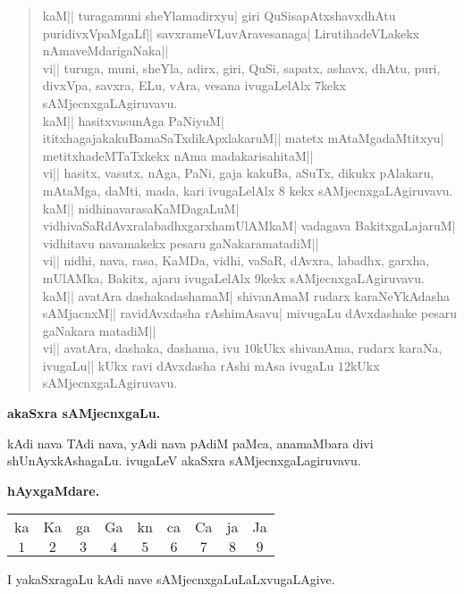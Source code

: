 \begin{verse}
kaM|| turagamuni sheYlamadirxyu| giri QuSisapAtxshavxdhAtu puridivxVpaMgaLf|| savxrameVLuvAravesanaga| LirutihadeVLakekx nAmaveMdarigaNaka||\\

vi|| turuga, muni, sheYla, adirx, giri, QuSi, sapatx, ashavx, dhAtu, puri, divxVpa, savxra, ELu, vAra, vesana ivugaLelAlx $7$kekx sAMjecnxgaLAgiruvavu.\\

kaM|| hasitxvasunAga PaNiyuM| ititxhagajakakuBamaSaTxdikApxlakaruM|| matetx mAtaMgadaMtitxyu| metitxhadeMTaTxkekx nAma madakarisahitaM||\\

vi|| hasitx, vasutx, nAga, PaNi, gaja kakuBa, aSuTx, dikukx pAlakaru, mAtaMga, daMti, mada, kari ivugaLelAlx $8$ kekx sAMjecnxgaLAgiruvavu.\\

kaM|| nidhinavarasaKaMDagaLuM| vidhivaSaRdAvxralabadhxgarxhamUlAMkaM| vadagava BakitxgaLajaruM| vidhitavu navamakekx pesaru gaNakaramatadiM||\\

vi|| nidhi, nava, rasa, KaMDa, vidhi, vaSaR, dAvxra, labadhx, garxha, mUlAMka, Bakitx, ajaru ivugaLelAlx $9$kekx sAMjecnxgaLAgiruvavu.\\

kaM|| avatAra dashakadashamaM| shivanAmaM rudarx karaNeYkAdasha sAMjacnxM|| ravidAvxdasha rAshimAsavu| mivugaLu dAvxdashake pesaru gaNakara matadiM||\\

vi|| avatAra, dashaka, dashama, ivu $10$kUkx shivanAma, rudarx karaNa, ivugaLu|| kUkx ravi dAvxdasha rAshi mAsa ivugaLu $12$kUkx sAMjecnxgaLAgiruvavu.
\end{verse}

\eject

\begin{center}
{\LARGE\bf akaSxra sAMjecnxgaLu.}
\end{center}

kAdi nava TAdi nava, yAdi nava pAdiM paMca, anamaMbara divi shUnAyxkAshagaLu. ivugaLeV akaSxra sAMjecnxgaLagiruvavu.

\begin{center}
{\large\bf hAyxgaMdare.}
\end{center}


\begin{center}
\begin{tabular}{ccccccccc}
ka & Ka & ga & Ga & kn & ca & Ca & ja & Ja\\
$1$ & $2$ & $3$ &$4$ & $5$ & $6$ & $7$ & $8$ &$9$\\
\end{tabular}
\end{center}
I yakaSxragaLu kAdi nave sAMjecnxgaLuLaLxvugaLAgive.

